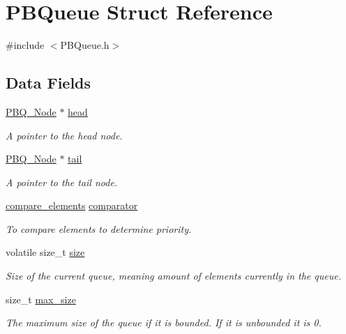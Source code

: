 \hypertarget{struct_p_b_queue}{}\section{P\+B\+Queue Struct Reference}
\label{struct_p_b_queue}


{\ttfamily \#include $<$P\+B\+Queue.\+h$>$}

\subsection*{Data Fields}
\begin{DoxyCompactItemize}
\item 
\hyperlink{struct_p_b_q___node}{P\+B\+Q\+\_\+\+Node} $\ast$ \hyperlink{struct_p_b_queue_ab4aace72deb6ab6ac22137e740a3968b}{head}
\begin{DoxyCompactList}\small\item\em A pointer to the head node. \end{DoxyCompactList}\item 
\hyperlink{struct_p_b_q___node}{P\+B\+Q\+\_\+\+Node} $\ast$ \hyperlink{struct_p_b_queue_a40a7192117a39559e60255079a1134fb}{tail}
\begin{DoxyCompactList}\small\item\em A pointer to the tail node. \end{DoxyCompactList}\item 
\hyperlink{_p_b_queue_8h_a7792d935a40458b9a7a58b2b62fc5466}{compare\+\_\+elements} \hyperlink{struct_p_b_queue_a0e28f62bf96f811d42068f8d6b76cd47}{comparator}
\begin{DoxyCompactList}\small\item\em To compare elements to determine priority. \end{DoxyCompactList}\item 
volatile size\+\_\+t \hyperlink{struct_p_b_queue_ad4e7ef20daed39b2cd453058b6fc4c63}{size}
\begin{DoxyCompactList}\small\item\em Size of the current queue, meaning amount of elements currently in the queue. \end{DoxyCompactList}\item 
size\+\_\+t \hyperlink{struct_p_b_queue_af4728438dee601cb2554d9bf18d78a43}{max\+\_\+size}
\begin{DoxyCompactList}\small\item\em The maximum size of the queue if it is bounded. If it is unbounded it is 0. \end{DoxyCompactList}\item 

\end{DoxyCompactItemize}
